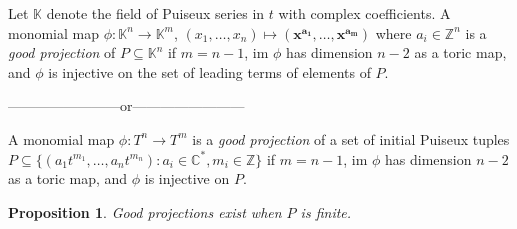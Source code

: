 \documentclass[12pt]{amsart}
\newtheorem{proposition}[theorem]{Proposition}
\newenvironment{definition}[1][Definition]{\begin{trivlist}
\item[\hskip \labelsep {\bfseries #1}]}{\end{trivlist}}
\begin{document}
\begin{definition}
Let $\mathbb{K}$ denote the field of Puiseux series in $t$ with complex coefficients. A monomial map $\phi:\mathbb{K}^n\rightarrow \mathbb{K}^m$, $(x_1,\ldots,x_n)\mapsto (\mathbf{x^{a_1}},\ldots,\mathbf{x^{a_m}})$ where $a_i\in\mathbb{Z}^n$ is a \textit{good projection} of $P\subseteq\mathbb{K}^n$ if $m=n-1$, im $\phi$ has dimension $n-2$ as a toric map, and $\phi$ is injective on the set of leading terms of elements of $P$.

------------------------or------------------------

A monomial map $\phi:T^n\rightarrow T^{m}$ is a \textit{good projection} of a set of initial Puiseux tuples $P\subseteq\{(a_1t^{m_1},\ldots,a_nt^{m_n}):a_i\in\mathbb{C^*},m_i\in\mathbb{Z}\}$ if $m=n-1$, im $\phi$ has dimension $n-2$ as a toric map, and $\phi$ is injective on $P$.
\end{definition}
\begin{proposition}
Good projections exist when $P$ is finite.
\end{proposition}
\end{document}
